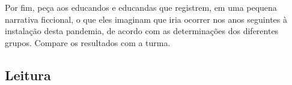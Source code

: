 \documentclass[12pt]{extarticle}
\begin{document}
Por fim, peça aos educandos e educandas que registrem, em uma pequena
narrativa ficcional, o que eles imaginam que iria ocorrer nos anos
seguintes à instalação desta pandemia, de acordo com as determinações
dos diferentes grupos. Compare os resultados com a turma.


\subsection{Leitura}


\end{document}
